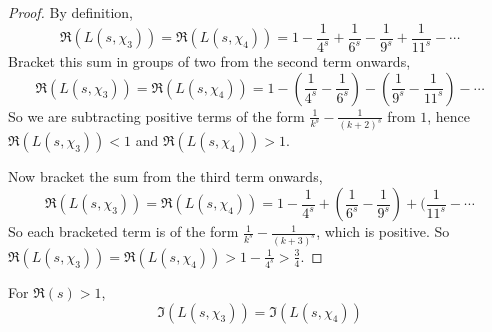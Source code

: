 \documentclass{unswmaths}
\begin{document}
    \begin{proof}
        By definition,
        \begin{equation*}
            \Re(L(s,\chi_3)) = \Re(L(s,\chi_4)) = 1-\frac{1}{4^s}+\frac{1}{6^s}-\frac{1}{9^s}+\frac{1}{11^s}-\cdots
        \end{equation*}
        Bracket this sum in groups of two from the second term onwards,
        \begin{equation*}
            \Re(L(s,\chi_3)) = \Re(L(s,\chi_4)) = 1-(\frac{1}{4^s}-\frac{1}{6^s})-(\frac{1}{9^s}-\frac{1}{11^s})-\cdots
        \end{equation*}
        So we are subtracting positive terms of the form $\frac{1}{k^s}-\frac{1}{(k+2)^s}$ from $1$, hence $\Re(L(s,\chi_3)) < 1$
        and $\Re(L(s,\chi_4)) > 1$.
        
        Now bracket the sum from the third term onwards, 
        \begin{equation*}
            \Re(L(s,\chi_3)) = \Re(L(s,\chi_4)) = 1-\frac{1}{4^s}+(\frac{1}{6^s}-\frac{1}{9^s})+(\frac{1}{11^s}-\cdots
        \end{equation*}
        So each bracketed term is of the form $\frac{1}{k^s}-\frac{1}{(k+3)^s}$, which is positive. So $\Re(L(s,\chi_3)) = \Re(L(s,\chi_4)) > 1-\frac{1}{4^s} > \frac{3}{4}$.
    \end{proof}
    \begin{lemma}
        For $\Re(s) > 1$, 
        \begin{equation*}
            \Im(L(s,\chi_3)) = \Im(L(s,\chi_4))
        \end{equation*}
    \end{lemma}
    
    
\end{document}
